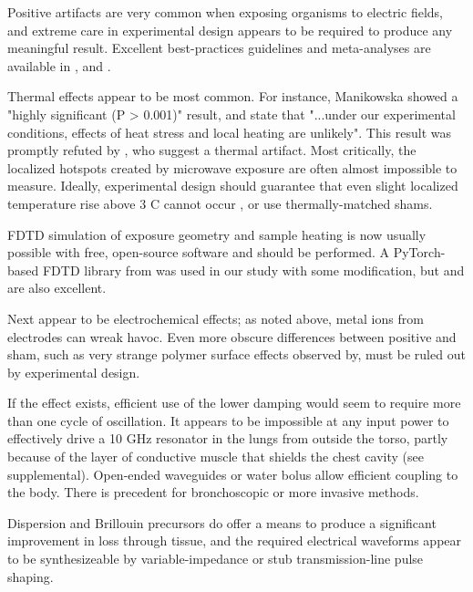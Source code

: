 \documentclass[paper.tex]{subfiles}
\begin{document}
\begin{multicols}{1}
Positive artifacts are very common when exposing organisms to electric fields, and extreme care in experimental design appears to be required to produce any meaningful result. Excellent best-practices guidelines and meta-analyses are available in \cite{Biological2016} \cite{Comprehensive2018} \cite{Funding2019}, \cite{chou1996radio} and \cite{Effects2016}.

Thermal effects appear to be most common. For instance, Manikowska\cite{Effects1985a} showed a "highly significant (P > 0.001)" result, and state that "...under our experimental conditions, effects of heat stress and local heating are unlikely". This result was promptly refuted by \cite{Cytogenetic1986}, who suggest a thermal artifact. Most critically, the localized hotspots created by microwave exposure are often almost impossible to measure. Ideally, experimental design should guarantee that even slight localized temperature rise above 3 C cannot occur \cite{Sharp1983}\cite{Effects1951}\cite{DNA2004}, or use thermally-matched shams\cite{Basic1983}.

FDTD simulation of exposure geometry and sample heating is now usually possible with free, open-source software and should be performed. A PyTorch-based FDTD library from \cite{Highly2019} was used in our study with some modification, but \cite{CUDAbased2019} and \cite{openEMS} are also excellent. 

Next appear to be electrochemical\cite{Comparative2003} effects; as noted above, metal ions from electrodes can wreak havoc. Even more obscure differences between positive and sham, such as very strange polymer surface effects observed by\cite{Effect1994a}, must be ruled out by experimental design.

If the effect exists, efficient use of the lower damping would seem to require more than one cycle of oscillation. It appears to be impossible at any input power to effectively drive a 10 GHz resonator in the lungs from outside the torso, partly because of the layer of conductive muscle that shields the chest cavity (see supplemental). Open-ended waveguides\cite{OpenEnded1982}\cite{Analysis1989}\cite{142018} or water bolus allow efficient coupling to the body. There is precedent for bronchoscopic \cite{Flexible2019}\cite{Antenna2018} or more invasive methods\cite{Implantable1980}\cite{Implantable1982}\cite{Electromagnetic1983}. 

Dispersion and Brillouin precursors do offer a means to produce a significant improvement in loss through tissue, and the required electrical waveforms appear to be synthesizeable by variable-impedance or stub transmission-line pulse shaping\cite{Coaxial1985}\cite{Arbitrarya}. 


\end{multicols}
\end{document}
